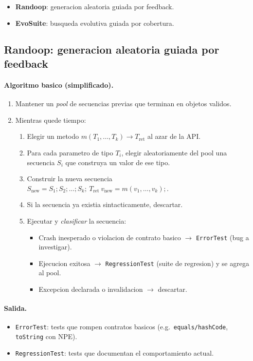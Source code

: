 \documentclass[12pt,a4paper]{article}
\begin{document}
\begin{itemize}
  \item \textbf{Randoop}: generacion aleatoria guiada por feedback.
  \item \textbf{EvoSuite}: busqueda evolutiva guiada por cobertura.
\end{itemize}

\subsection{Randoop: generacion aleatoria guiada por feedback}

\paragraph{Algoritmo basico (simplificado).}

\begin{enumerate}
  \item Mantener un \emph{pool} de secuencias previas que terminan en objetos validos.
  \item Mientras quede tiempo:
  \begin{enumerate}
    \item Elegir un metodo $m(T_1, \dots, T_k) \to T_{\text{ret}}$ al azar de la API.
    \item Para cada parametro de tipo $T_i$, elegir aleatoriamente del pool una secuencia
    $S_i$ que construya un valor de ese tipo.
    \item Construir la nueva secuencia $S_{\text{new}} = S_1; S_2; \dots; S_k;\
    T_{\text{ret}}\ v_{\text{new}} = m(v_1, \dots, v_k);$.
    \item Si la secuencia ya existia sintacticamente, descartar.
    \item Ejecutar y \emph{clasificar} la secuencia:
    \begin{itemize}
      \item Crash inesperado o violacion de contrato basico $\to$ \texttt{ErrorTest}
      (bug a investigar).
      \item Ejecucion exitosa $\to$ \texttt{RegressionTest} (suite de regresion) y se agrega
      al pool.
      \item Excepcion declarada o invalidacion $\to$ descartar.
    \end{itemize}
  \end{enumerate}
\end{enumerate}

\paragraph{Salida.}
\begin{itemize}
  \item \texttt{ErrorTest}: tests que rompen contratos basicos (e.g.\
  \texttt{equals/hashCode}, \texttt{toString} con NPE).
  \item \texttt{RegressionTest}: tests que documentan el comportamiento actual.
\end{itemize}
\end{document}
